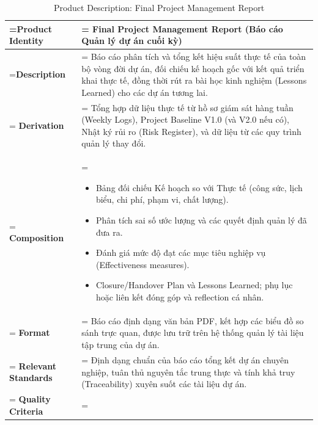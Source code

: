 \documentclass{article}
\begin{document}
\clearpage
\begin{table}[H]
    \centering
    \caption{Product Description: Final Project Management Report}
    \renewcommand{\arraystretch}{1.5}
    \begin{tabularx}{\textwidth}{|>{\hsize=0.5\hsize\linewidth=\hsize\bfseries}X|>{\hsize=1.5\hsize\linewidth=\hsize}X|}
        \hline
        Product Identity & \textbf{Final Project Management Report} (Báo cáo Quản lý dự án cuối kỳ) \\
        \hline
        Description & Báo cáo phân tích và tổng kết hiệu suất thực tế của toàn bộ vòng đời dự án, đối chiếu kế hoạch gốc với kết quả triển khai thực tế, đồng thời rút ra bài học kinh nghiệm (Lessons Learned) cho các dự án tương lai. \\
        \hline
        Derivation & Tổng hợp dữ liệu thực tế từ hồ sơ giám sát hàng tuần (Weekly Logs), Project Baseline V1.0 (và V2.0 nếu có), Nhật ký rủi ro (Risk Register), và dữ liệu từ các quy trình quản lý thay đổi. \\
        \hline
        Composition & 
        \vspace{-0.8em}
        \begin{itemize}[leftmargin=*, nosep]
            \item Bảng đối chiếu Kế hoạch so với Thực tế (công sức, lịch biểu, chi phí, phạm vi, chất lượng).
            \item Phân tích sai số ước lượng và các quyết định quản lý đã đưa ra.
            \item Đánh giá mức độ đạt các mục tiêu nghiệp vụ (Effectiveness measures).
            \item Closure/Handover Plan và Lessons Learned; phụ lục hoặc liên kết đóng góp và reflection cá nhân.
        \end{itemize}
        \vspace{-1em} \\
        \hline
        Format & Báo cáo định dạng văn bản PDF, kết hợp các biểu đồ so sánh trực quan, được lưu trữ trên hệ thống quản lý tài liệu tập trung của dự án. \\
        \hline
        Relevant Standards & Định dạng chuẩn của báo cáo tổng kết dự án chuyên nghiệp, tuân thủ nguyên tắc trung thực và tính khả truy (Traceability) xuyên suốt các tài liệu dự án. \\
        \hline
        Quality Criteria & 
        \vspace{-0.8em}

\end{tabularx}
\end{table}
\end{document}
